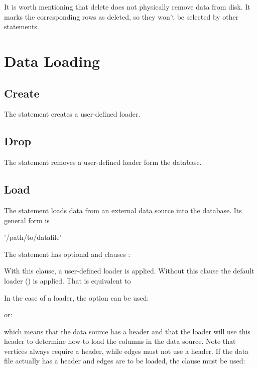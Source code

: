 It is worth mentioning that delete
does not physically remove data from disk.
It marks the corresponding rows as deleted,
so they won't be selected by other statements.


\section{Data Loading}
\subsection{Create}
The  statement creates a user-defined loader.


\subsection{Drop}
The  statement removes a user-defined loader
form the database.


\subsection{Load}
The  statement loads data from an external
data source into the database.
Its general form is

 '/path/to/datafile'  

The  statement has optional  and  clauses
:

 

With this clause, a user-defined loader is applied.
Without this clause the default loader ()
is applied. That is equivalent to

 

In the case of a  loader,
the  option can be used:


or:


which means that the data source has a header and that the loader
will use this header to determine how to load the columns in the data source.
Note that vertices always require a header, while edges
must not use a header. If the data file actually has a header
and edges are to be loaded, the  clause must be used:

